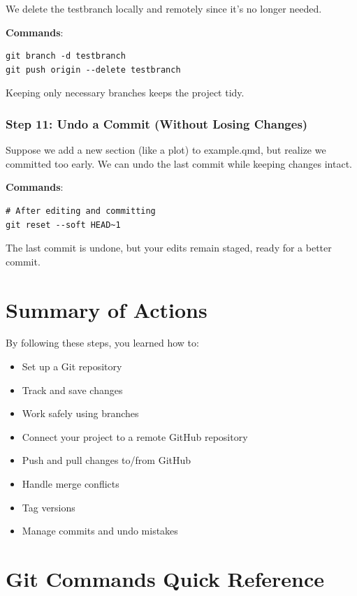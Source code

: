 \documentclass[
  11pt,
  a4paper,
]{article}
\begin{document}
We delete the testbranch locally and remotely since it's no longer
needed.

\textbf{Commands}:

\begin{verbatim}
git branch -d testbranch
git push origin --delete testbranch
\end{verbatim}

Keeping only necessary branches keeps the project tidy. \newpage

\subsubsection{Step 11: Undo a Commit (Without Losing
Changes)}\label{step-11-undo-a-commit-without-losing-changes}

Suppose we add a new section (like a plot) to example.qmd, but realize
we committed too early. We can undo the last commit while keeping
changes intact.

\textbf{Commands}:

\begin{verbatim}
# After editing and committing
git reset --soft HEAD~1
\end{verbatim}

The last commit is undone, but your edits remain staged, ready for a
better commit. \newpage

\section{Summary of Actions}\label{summary-of-actions}

By following these steps, you learned how to:

\begin{itemize}
\item
  Set up a Git repository
\item
  Track and save changes
\item
  Work safely using branches
\item
  Connect your project to a remote GitHub repository
\item
  Push and pull changes to/from GitHub
\item
  Handle merge conflicts
\item
  Tag versions
\item
  Manage commits and undo mistakes \newpage
\end{itemize}

\section{Git Commands Quick
Reference}\label{git-commands-quick-reference}
\end{document}
